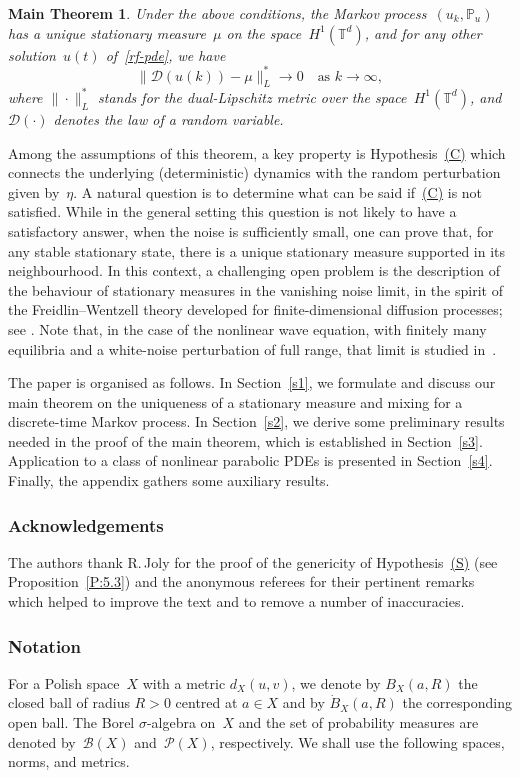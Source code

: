 \documentclass[11pt]{article}
\theoremstyle{plain}
\theoremstyle{definition}
\let\mathcal\mathscr
\theoremstyle{plain}
\newtheorem*{mt}{Main Theorem}
\numberwithin{equation}{section}
\newcommand{\IP}{{\mathbb P}}
\newcommand{\T}{{\mathbb T}}
\newcommand{\BB}{{\mathcal B}}
\newcommand{\DD}{{\mathcal D}}
\newcommand{\PP}{{\mathcal P}}
\begin{document}
\begin{mt}
Under the above conditions, the Markov process~$(u_k,\IP_u)$ has a unique stationary measure~$\mu$ on the space~$H^1(\T^d)$, and for any other solution~$u(t)$ of~\eqref{rf-pde}, we have
\[
\|\DD(u(k))-\mu\|_L^*\to0\quad\text{as $k\to\infty$},
\]
where $\|\cdot\|_L^*$ stands for the dual-Lipschitz metric over the space~$H^1(\T^d)$, and~$\DD(\cdot)$ denotes the law of a random variable.
\end{mt}

Among the assumptions of this theorem, a key property is Hypothesis~\hyperlink{C}{(C)} which connects the underlying (deterministic) dynamics with the random perturbation given by~$\eta$. A natural question is to determine what can be said if~\hyperlink{C}{(C)} is not satisfied. While in the general setting this question is not likely to have a satisfactory answer, when the noise is sufficiently small, one can prove that, for any stable stationary state, there is a unique stationary measure supported in its neighbourhood. In this context, a challenging open problem is the description of the behaviour of stationary measures in the vanishing noise limit, in the spirit of the Freidlin--Wentzell theory developed for finite-dimensional diffusion processes; see \cite[Chap.\,6]{FW1984}. Note that, in the case of the nonlinear wave equation, with finitely many equilibria and a white-noise perturbation of full range, that limit is studied in~\cite{martirosyan-2017}.

The paper is organised as follows. In Section~\ref{s1}, we formulate and discuss our main theorem on the uniqueness of a stationary measure and mixing for a discrete-time Markov process. In Section~\ref{s2}, we derive some preliminary results needed in the proof of the main theorem, which is established in Section~\ref{s3}. Application to a class of nonlinear parabolic PDEs is presented in Section~\ref{s4}. Finally, the appendix gathers some auxiliary results.

\subsubsection*{Acknowledgements}
The authors thank R.\,Joly for the proof of the genericity of Hypothesis~\hyperlink{S}{\rm(S)} (see Proposition~\ref{P:5.3}) and the anonymous referees for their pertinent remarks which helped to improve the text and to remove a number of inaccuracies.

\subsubsection*{Notation}
For a Polish space~$X$ with a metric $d_X(u,v)$, we denote by $B_X(a,R)$ the closed ball of radius $R > 0$ centred at $a\in X$ and by $\dot B_X(a,R)$ the corresponding open ball. The Borel $\sigma$-algebra on~$X$ and the set of probability measures are denoted by~$\BB(X)$ and~$\PP(X)$, respectively. We shall use the following spaces, norms, and metrics.
\end{document}
